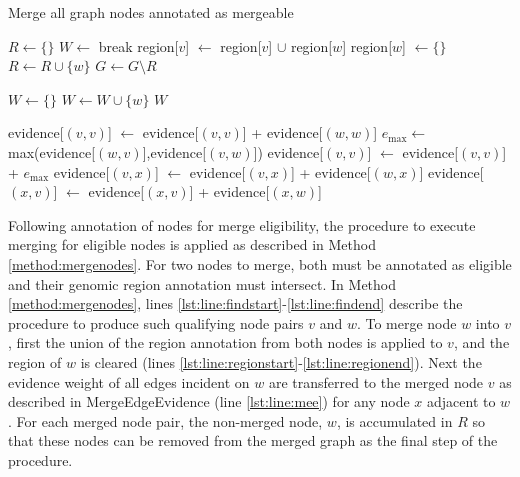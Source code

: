 \documentclass{article}
\begin{document}
\begin{algorithm}[t!]
\caption{Merge all graph nodes annotated as mergeable}
\label{method:mergenodes}
\begin{algorithmic}[1]
\State $R \gets \{\}$
 \label{lst:line:findstart}
\Loop
\State $W \gets$ 
 break \EndIf
{} \label{lst:line:findend}
\State region[$v$] $\gets$ region[$v$] $\cup$ region[$w$] \label{lst:line:regionstart}
\State region[$w$] $\gets \{\}$ \label{lst:line:regionend}
\State {}
\EndFor
\State $R \gets R \cup \{w\}$
\EndFor
\EndLoop
\EndFor
\State $G \gets G \setminus R$
\EndProcedure
\Statex

\State $W \gets \{\}$
\State $W \gets W \cup \{w\}$
\EndIf
\EndFor
\State \Return $W$
\EndProcedure
\Statex

 \label{lst:line:mee}
\State evidence[$(v,v)$] $\gets$ evidence[$(v,v)$] + evidence[$(w,w)$]
\State $e_{\text{max}} \gets$ max(evidence[$(w,v)$],evidence[$(v,w)$])
\State evidence[$(v,v)$] $\gets$ evidence[$(v,v)$] + $e_{\text{max}}$
\Else
\State evidence[$(v,x)$] $\gets$ evidence[$(v,x)$] + evidence[$(w,x)$]
\State evidence[$(x,v)$] $\gets$ evidence[$(x,v)$] + evidence[$(x,w)$]
\EndIf
\EndProcedure
\end{algorithmic}
\end{algorithm}

Following annotation of nodes for merge eligibility, the procedure to execute merging for eligible nodes is applied as described in Method \ref{method:mergenodes}. For two nodes to merge, both must be annotated as eligible and their genomic region annotation must intersect. In Method \ref{method:mergenodes}, lines \ref{lst:line:findstart}-\ref{lst:line:findend} describe the procedure to produce such qualifying node pairs $v$ and $w$. To merge node $w$ into $v$, first the union of the region annotation from both nodes is applied to $v$, and the region of $w$ is cleared (lines \ref{lst:line:regionstart}-\ref{lst:line:regionend}). Next the evidence weight of all edges incident on $w$ are transferred to the merged node $v$ as described in MergeEdgeEvidence (line \ref{lst:line:mee}) for any node $x$ adjacent to $w$. For each merged node pair, the non-merged node, $w$, is accumulated in $R$ so that these nodes can be removed from the merged graph as the final step of the procedure.
\end{document}
